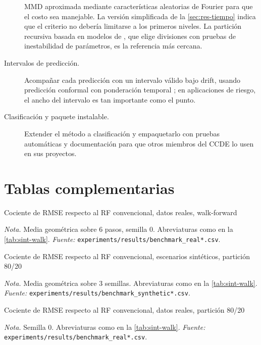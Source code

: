 \documentclass[11pt,a4paper]{article}
\newcommand{\nota}[1]{\par\smallskip\raggedright\footnotesize\textit{Nota.} #1}
\begin{document}
\begin{description}
  MMD aproximada mediante características aleatorias de Fourier \parencite{rahimi2007} para que el
  costo sea manejable. La versión simplificada de la \cref{sec:res-tiempo} indica que el criterio no
  debería limitarse a los primeros niveles. La partición recursiva basada en modelos de
  \textcite{zeileis2008}, que elige divisiones con pruebas de inestabilidad de parámetros, es la
  referencia más cercana.
  \item[Intervalos de predicción.] Acompañar cada predicción con un intervalo válido bajo drift,
  usando predicción conformal con ponderación temporal \parencite{barber2023}; en aplicaciones de
  riesgo, el ancho del intervalo es tan importante como el punto.
  \item[Clasificación y paquete instalable.] Extender el método a clasificación y empaquetarlo con
  pruebas automáticas y documentación para que otros miembros del CCDE lo usen en sus proyectos.
\end{description}

\printbibliography[title={Referencias}]

\appendix
\section{Tablas complementarias}\label{app:tablas}

\begin{table}[htbp]
  \centering
  \caption{Cociente de RMSE respecto al RF convencional, datos reales, walk-forward}\label{tab:real-walk}
  \small
  
  \nota{Media geométrica sobre 6 pasos, semilla 0. Abreviaturas como en la \cref{tab:sint-walk}.
  \textit{Fuente:} \texttt{experiments/results/benchmark\_real*.csv}.}
\end{table}

\begin{table}[htbp]
  \centering
  \caption{Cociente de RMSE respecto al RF convencional, escenarios sintéticos, partición 80/20}\label{tab:sint-static}
  \small
  
  \nota{Media geométrica sobre 3 semillas. Abreviaturas como en la \cref{tab:sint-walk}.
  \textit{Fuente:} \texttt{experiments/results/benchmark\_synthetic*.csv}.}
\end{table}

\begin{table}[htbp]
  \centering
  \caption{Cociente de RMSE respecto al RF convencional, datos reales, partición 80/20}\label{tab:real-static}
  \small
  
  \nota{Semilla 0. Abreviaturas como en la \cref{tab:sint-walk}. \textit{Fuente:}
  \texttt{experiments/results/benchmark\_real*.csv}.}
\end{table}
\end{document}
